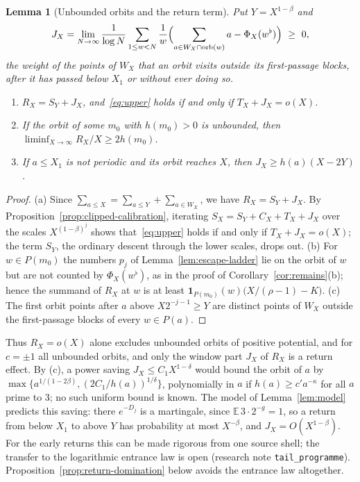 \documentclass[12pt]{amsart}
\newtheorem{lemma}{Lemma}
\theoremstyle{definition}
\theoremstyle{remark}
\begin{document}
\begin{lemma}[Unbounded orbits and the return term]
\label{rem:return-divergence}
Put $Y=X^{1-\beta}$ and
\[
 J_X=\lim_{N\to\infty}\frac1{\log N}\sum_{1\le w<N}\frac1w\Bigl(\sum_{a\in W_X\cap\operatorname{orb}(w)}a-\Phi_X(w^\flat)\Bigr)\ \ge\ 0,
\]
the weight of the points of $W_X$ that an orbit visits outside its first-passage blocks, after it has passed below $X_1$ or without ever doing so.
\begin{enumerate}[label=(\alph*)]
 \item $R_X=S_Y+J_X$, and~\eqref{eq:upper} holds if and only if $T_X+J_X=o(X)$.
 \item If the orbit of some $m_0$ with $h(m_0)>0$ is unbounded, then $\liminf_{X\to\infty}R_X/X\ge2h(m_0)$.
 \item If $a\le X_1$ is not periodic and its orbit reaches $X$, then $J_X\ge h(a)(X-2Y)$.
\end{enumerate}
\end{lemma}

\begin{proof}
(a) Since $\sum_{a\le X}=\sum_{a\le Y}+\sum_{a\in W_X}$, we have $R_X=S_Y+J_X$. By Proposition~\ref{prop:clipped-calibration}, iterating $S_X=S_Y+C_X+T_X+J_X$ over the scales $X^{(1-\beta)^j}$ shows that~\eqref{eq:upper} holds if and only if $T_X+J_X=o(X)$; the term $S_Y$, the ordinary descent through the lower scales, drops out. (b) For $w\in P(m_0)$ the numbers $p_j$ of Lemma~\ref{lem:escape-ladder} lie on the orbit of $w$ but are not counted by $\Phi_X(w^\flat)$, as in the proof of Corollary~\ref{cor:remains}(b); hence the summand of $R_X$ at $w$ is at least $\mathbf 1_{P(m_0)}(w)\bigl(X/(\rho-1)-K\bigr)$. (c) The first orbit points after $a$ above $X2^{-j-1}\ge Y$ are distinct points of $W_X$ outside the first-passage blocks of every $w\in P(a)$.
\end{proof}

Thus $R_X=o(X)$ alone excludes unbounded orbits of positive potential, and for $c=\pm1$ all unbounded orbits, and only the window part $J_X$ of $R_X$ is a return effect. By (c), a power saving $J_X\le C_1X^{1-\delta}$ would bound the orbit of $a$ by $\max\{a^{1/(1-2\beta)},(2C_1/h(a))^{1/\delta}\}$, polynomially in $a$ if $h(a)\ge c'a^{-\kappa}$ for all $a$ prime to $3$; no such uniform bound is known. The model of Lemma~\ref{lem:model} predicts this saving: there $e^{-D_j}$ is a martingale, since $\mathbb E\,3\cdot2^{-g}=1$, so a return from below $X_1$ to above $Y$ has probability at most $X^{-\beta}$, and $J_X=O(X^{1-\beta})$. For the early returns this can be made rigorous from one source shell; the transfer to the logarithmic entrance law is open (research note \texttt{tail\_programme}). Proposition~\ref{prop:return-domination} below avoids the entrance law altogether.
\end{document}
